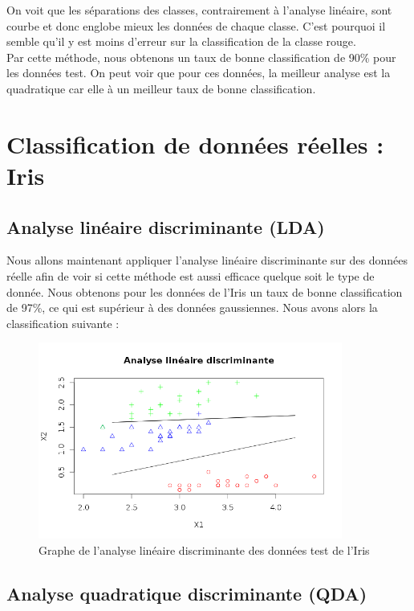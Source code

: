 \documentclass[a4paper,11pt]{article}
\begin{document}
  On voit que les séparations des classes, contrairement à l'analyse linéaire, sont courbe
  et donc englobe mieux les données de chaque classe. C'est pourquoi il semble qu'il y est moins
  d'erreur sur la classification de la classe rouge.\\
  
  Par cette méthode, nous obtenons un taux de bonne classification de 90\% pour les données test.
  On peut voir que pour ces données, la meilleur analyse est la quadratique car elle à un meilleur
  taux de bonne classification.
  
  \section{Classification de données réelles : Iris}
  
  \subsection{Analyse linéaire discriminante (LDA)}
  
  Nous allons maintenant appliquer l'analyse linéaire discriminante sur des données réelle afin
  de voir si cette méthode est aussi efficace quelque soit le type de donnée. Nous obtenons pour les 
  données de l'Iris un taux de bonne classification de 97\%, ce qui est supérieur à des données 
  gaussiennes. Nous avons alors la classification suivante :\\
  
  \newpage
  \begin{figure}[h]
   \center
   \includegraphics[width=10cm]{iris_lineaire.png}
   \caption{Graphe de l'analyse linéaire discriminante des données test de l'Iris}
  \end{figure}
  
  \subsection{Analyse quadratique discriminante (QDA)}
  
\end{document}
